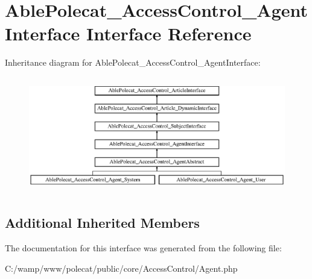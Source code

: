 \hypertarget{interface_able_polecat___access_control___agent_interface}{}\section{Able\+Polecat\+\_\+\+Access\+Control\+\_\+\+Agent\+Interface Interface Reference}
\label{interface_able_polecat___access_control___agent_interface}
Inheritance diagram for Able\+Polecat\+\_\+\+Access\+Control\+\_\+\+Agent\+Interface\+:\begin{figure}[H]
\begin{center}
\leavevmode
\includegraphics[height=5.121951cm]{interface_able_polecat___access_control___agent_interface}
\end{center}
\end{figure}
\subsection*{Additional Inherited Members}


The documentation for this interface was generated from the following file\+:\begin{DoxyCompactItemize}
\item 
C\+:/wamp/www/polecat/public/core/\+Access\+Control/Agent.\+php\end{DoxyCompactItemize}

